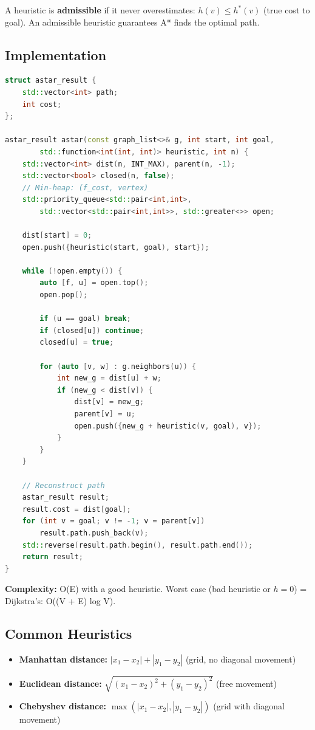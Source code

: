 A heuristic is \textbf{admissible} if it never overestimates: $h(v) \le h^*(v)$ (true cost to goal). An admissible heuristic guarantees A* finds the optimal path.

\subsection{Implementation}

\begin{lstlisting}[language=C++]
struct astar_result {
    std::vector<int> path;
    int cost;
};

astar_result astar(const graph_list<>& g, int start, int goal,
        std::function<int(int, int)> heuristic, int n) {
    std::vector<int> dist(n, INT_MAX), parent(n, -1);
    std::vector<bool> closed(n, false);
    // Min-heap: (f_cost, vertex)
    std::priority_queue<std::pair<int,int>,
        std::vector<std::pair<int,int>>, std::greater<>> open;

    dist[start] = 0;
    open.push({heuristic(start, goal), start});

    while (!open.empty()) {
        auto [f, u] = open.top();
        open.pop();

        if (u == goal) break;
        if (closed[u]) continue;
        closed[u] = true;

        for (auto [v, w] : g.neighbors(u)) {
            int new_g = dist[u] + w;
            if (new_g < dist[v]) {
                dist[v] = new_g;
                parent[v] = u;
                open.push({new_g + heuristic(v, goal), v});
            }
        }
    }

    // Reconstruct path
    astar_result result;
    result.cost = dist[goal];
    for (int v = goal; v != -1; v = parent[v])
        result.path.push_back(v);
    std::reverse(result.path.begin(), result.path.end());
    return result;
}
\end{lstlisting}

\textbf{Complexity:} O(E) with a good heuristic. Worst case (bad heuristic or $h = 0$) = Dijkstra's: O((V + E) log V).

\subsection{Common Heuristics}

\begin{itemize}
\item \textbf{Manhattan distance:} $|x_1 - x_2| + |y_1 - y_2|$ (grid, no diagonal movement)
\item \textbf{Euclidean distance:} $\sqrt{(x_1-x_2)^2 + (y_1-y_2)^2}$ (free movement)
\item \textbf{Chebyshev distance:} $\max(|x_1-x_2|, |y_1-y_2|)$ (grid with diagonal movement)
\end{itemize}

